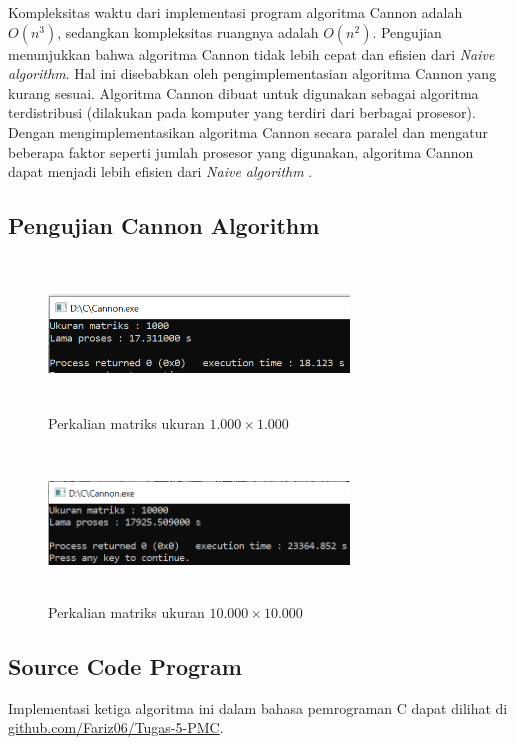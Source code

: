 \documentclass[conference]{IEEEtran}
\begin{document}
Kompleksitas waktu dari implementasi program algoritma Cannon adalah $O(n^3)$, 
sedangkan kompleksitas ruangnya adalah $O(n^2)$.
Pengujian menunjukkan bahwa algoritma Cannon tidak lebih cepat dan efisien dari \textit{Naive algorithm}.
Hal ini disebabkan oleh pengimplementasian algoritma Cannon yang kurang sesuai.
Algoritma Cannon dibuat untuk digunakan sebagai algoritma terdistribusi (dilakukan pada komputer yang terdiri dari berbagai prosesor).
Dengan mengimplementasikan algoritma Cannon secara paralel dan mengatur beberapa faktor seperti jumlah prosesor yang digunakan, algoritma Cannon dapat menjadi lebih efisien dari \textit{Naive algorithm} \cite{b2}.

\subsection{Pengujian Cannon Algorithm}

\begin{figure}[h]
    \includegraphics[width = 8cm, height = 4cm]{Cannon_1000.png}
    \centering
    \caption{Perkalian matriks ukuran $1.000\times1.000$}
 \end{figure}
 
 \begin{figure}[h]
    \includegraphics[width = 8cm, height = 4cm]{Cannon_10000.png}
    \centering
    \caption{Perkalian matriks ukuran $10.000\times10.000$}
 \end{figure}


\subsection{Source Code Program}
Implementasi ketiga algoritma ini dalam bahasa pemrograman C dapat dilihat di
\href{https://github.com/Fariz06/Tugas-5-PMC}{github.com/Fariz06/Tugas-5-PMC}.
\end{document}
